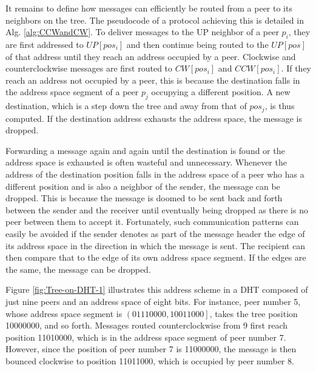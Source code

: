 \documentclass[12pt,english,journal]{elsarticle}
\numberwithin{equation}{section}
\numberwithin{figure}{section}
\theoremstyle{plain}
\theoremstyle{plain}
\begin{document}
It remains to define how messages can efficiently be routed from a
peer to its neighbors on the tree. The pseudocode of a protocol achieving
this is detailed in Alg. \ref{alg:CCWandCW}. To deliver messages
to the UP neighbor of a peer $p_{i}$, they are first addressed to
$UP\left[pos_{i}\right]$ and then continue being routed to the $UP\left[pos\right]$
of that address until they reach an address occupied by a peer. Clockwise
and counterclockwise messages are first routed to $CW\left[pos_{i}\right]$
and $CCW\left[pos_{i}\right]$. If they reach an address not occupied
by a peer, this is because the destination falls in the address space
segment of a peer $p_{j}$ occupying a different position. A new destination,
which is a step down the tree and away from that of $pos_{j}$, is
thus computed. If the destination address exhausts the address space,
the message is dropped.

Forwarding a message again and again until the destination is found
or the address space is exhausted is often wasteful and unnecessary.
Whenever the address of the destination position falls in the address
space of a peer who has a different position and is also a neighbor
of the sender, the message can be dropped. This is because the message
is doomed to be sent back and forth between the sender and the receiver
until eventually being dropped as there is no peer between them to
accept it. Fortunately, such communication patterns can easily be
avoided if the sender denotes as part of the message header the edge
of its address space in the direction in which the message is sent.
The recipient can then compare that to the edge of its own address
space segment. If the edges are the same, the message can be dropped.

Figure \ref{fig:Tree-on-DHT-1} illustrates this address scheme in
a DHT composed of just nine peers and an address space of eight bits.
For instance, peer number 5, whose address space segment is $\left(01110000,10011000\right]$,
takes the tree position 10000000, and so forth. Messages routed counterclockwise
from 9 first reach position 11010000, which is in the address space
segment of peer number 7. However, since the position of peer number
7 is 11000000, the message is then bounced clockwise to position 11011000,
which is occupied by peer number 8.
\end{document}
